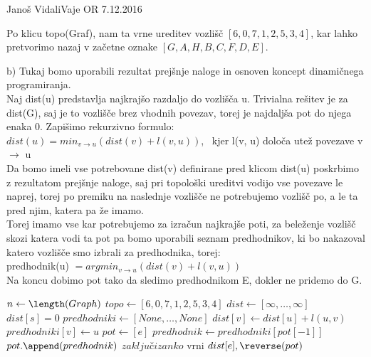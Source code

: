 \begin{naloga}{Janoš Vidali}{Vaje OR 7.12.2016}
\begin{odgovor}
\noindent Po klicu topo(Graf), nam ta vrne ureditev vozlišč $[6, 0, 7, 1, 2, 5, 3, 4]$, 
kar lahko pretvorimo nazaj v začetne oznake $[G, A, H, B, C, F, D, E]$. \pagebreak

\noindent b) Tukaj bomo uporabili rezultat prejšnje naloge in osnoven 
koncept dinamičnega programiranja.\\

\noindent Naj dist(u) predstavlja najkrajšo razdaljo do vozlišča u.
Trivialna rešitev je za dist(G), saj je to vozlišče brez vhodnih povezav, torej je najdaljša pot do njega
enaka 0. Zapišimo rekurzivno formulo: \\
$dist(u) = min_{v \rightarrow u}(dist(v) + l(v, u))$, \
kjer l(v, u) določa utež povezave v $\rightarrow$ u \\

\noindent Da bomo imeli vse potrebovane dist(v) definirane pred klicom dist(u) 
poskrbimo z rezultatom prejšnje naloge, saj pri topološki ureditvi vodijo vse povezave le naprej, 
torej po premiku na naslednje vozlišče ne potrebujemo vozlišč po, a le ta pred njim,
katera pa že imamo.\\

\noindent Torej imamo vse kar potrebujemo za izračun najkrajše poti, 
za beleženje vozlišč skozi katera vodi ta pot pa bomo uporabili seznam predhodnikov, 
ki bo nakazoval katero vozlišče smo izbrali za predhodnika, torej: \\
predhodnik(u) $= argmin_{v \rightarrow u}(dist(v) + l(v, u))$ \\
Na koncu dobimo pot tako da sledimo predhodnikom E, dokler ne pridemo do G.  \\

\begin{algorithmic}
	\State $n \gets \length(Graph)$
	\State $topo \gets [6, 0, 7, 1, 2, 5, 3, 4]$
	\State $dist \gets [\infty, \dots, \infty]$
	\State $dist[s] = 0$
	\State $predhodniki \gets [None, \dots, None]$
				\State $dist[v] \gets dist[u] + l(u, v)$
				\State $predhodniki[v] \gets u$
			\EndIf
		\EndFor
	\EndFor
	\State $pot \gets [e]$
	\While{\True}
		\State $predhodnik \gets predhodniki[pot[-1]]$
		\State $pot.\append(predhodnik)$
			\State $zaključi zanko$
		\EndIf
	\EndWhile
	\State vrni $dist[e], \reverse(pot)$
\EndFunction  \\
\end{algorithmic}


\end{odgovor}
\end{naloga}
